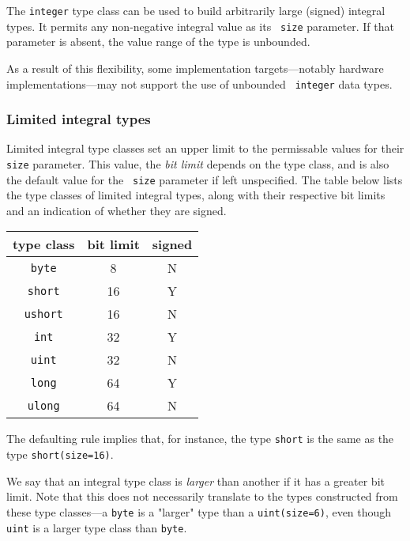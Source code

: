 The {\tt integer} type class can be used to build arbitrarily large
(signed) integral types. It permits any non-negative integral value as its {\tt
  size} parameter. If that parameter is absent, the value range of the
type is unbounded.

As a result of this flexibility, some implementation targets---notably
hardware implementations---may not support the use of unbounded {\tt
  integer} data types.

\subsubsection{Limited integral types}\label{sect:LimitedIntegralTypes}

Limited integral type classes set an upper limit to the permissable
values for their {\tt size} parameter. This value, the {\em bit limit}
depends on the type class, and is also the default value for the {\tt
  size} parameter if left unspecified. The table below lists the type
classes of limited integral types, along with their respective bit
limits and an indication of whether they are signed.

\begin{center}
\begin{tabular}{c|c|c}
type class   &   bit limit  &  signed \\ \hline \hline
{\tt byte}   &   8          &  N      \\ \hline
{\tt short}  &   16         &  Y      \\ \hline
{\tt ushort} &   16         &  N      \\ \hline
{\tt int}    &   32         &  Y      \\ \hline
{\tt uint}   &   32         &  N      \\ \hline
{\tt long}   &   64         &  Y      \\ \hline
{\tt ulong}  &   64         &  N      \\ \hline
\end{tabular}
\end{center}

The defaulting rule implies that, for instance, the type {\tt short}
is the same as the type {\tt short(size=16)}. 

We say that an integral type class is {\em larger} than another if it
has a greater bit limit. Note that this does not necessarily translate
to the types constructed from these type classes---a {\tt byte} is a
"larger" type than a {\tt uint(size=6)}, even though {\tt uint} is a
larger type class than {\tt byte}.

